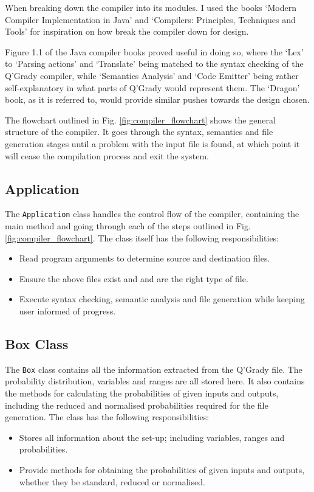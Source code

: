 \documentclass[report.tex]{subfiles}
\begin{document}
When breaking down the compiler into its modules. I used the books `Modern
Compiler Implementation in Java' \cite[Figure~1.1]{java_compiler} and 
`Compilers: Principles, Techniques and Tools'\cite{dragon_compiler} for
inspiration on how break the compiler down for design. 

Figure 1.1 of the Java compiler books proved useful in doing so, where the `Lex'
to `Parsing  actions' and `Translate' being matched to the syntax checking of
the Q'Grady compiler, while `Semantics Analysis' and `Code Emitter' being rather
self-explanatory in what parts of Q'Grady would represent them. The `Dragon'
book, as it is referred to, would provide similar pushes towards the design
chosen.

The flowchart outlined in Fig. \ref{fig:compiler_flowchart} shows the general
structure of the compiler. It goes through the syntax, semantics and file
generation stages until a problem with the input file is found, at which point
it will cease the compilation process and exit the system.

\subsection{Application} %
\label{sub:application}
The \texttt{Application} class handles the control flow of the compiler,
containing the main method and going through each of the steps outlined in Fig.
\ref{fig:compiler_flowchart}. The class itself has the following 
responsibilities:
\begin{itemize}
    \item Read program arguments to determine source and destination files.
    \item Ensure the above files exist and and are the right type of file.
    \item Execute syntax checking, semantic analysis and file generation while
    keeping user informed of progress.
\end{itemize}

\subsection{Box Class} %
\label{sub:box_class}
The \texttt{Box} class contains all the information extracted from the Q'Grady
file. The probability distribution, variables and ranges are all stored here. It
also contains the methods for calculating the probabilities of given inputs and
outputs, including the reduced and normalised probabilities required for the
file generation. The class has the following responsibilities:
\begin{itemize}
    \item Stores all information about the set-up; including variables, ranges
    and probabilities.
    \item Provide methods for obtaining the probabilities of given inputs and
    outputs, whether they be standard, reduced or normalised.
\end{itemize}
\end{document}
